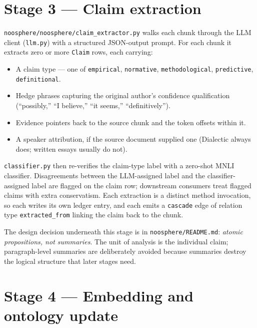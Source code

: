 \documentclass[11pt,letterpaper]{article}
\newcommand{\file}[1]{\texttt{#1}}
\begin{document}
\section{Stage 3 --- Claim extraction}

\file{noosphere/noosphere/claim\_extractor.py} walks each chunk through the LLM client (\file{llm.py}) with a structured JSON-output prompt. For each chunk it extracts zero or more \texttt{Claim} rows, each carrying:

\begin{itemize}[leftmargin=1.5em,itemsep=0.1em]
\item A claim type --- one of \texttt{empirical}, \texttt{normative}, \texttt{methodological}, \texttt{predictive}, \texttt{definitional}.
\item Hedge phrases capturing the original author's confidence qualification (``possibly,'' ``I believe,'' ``it seems,'' ``definitively'').
\item Evidence pointers back to the source chunk and the token offsets within it.
\item A speaker attribution, if the source document supplied one (Dialectic always does; written essays usually do not).
\end{itemize}

\file{classifier.py} then re-verifies the claim-type label with a zero-shot MNLI classifier. Disagreements between the LLM-assigned label and the classifier-assigned label are flagged on the claim row; downstream consumers treat flagged claims with extra conservatism. Each extraction is a distinct method invocation, so each writes its own ledger entry, and each emits a \texttt{cascade} edge of relation type \texttt{extracted\_from} linking the claim back to the chunk.

The design decision underneath this stage is in \file{noosphere/README.md}: \emph{atomic propositions, not summaries}. The unit of analysis is the individual claim; paragraph-level summaries are deliberately avoided because summaries destroy the logical structure that later stages need.

\section{Stage 4 --- Embedding and ontology update}
\end{document}
